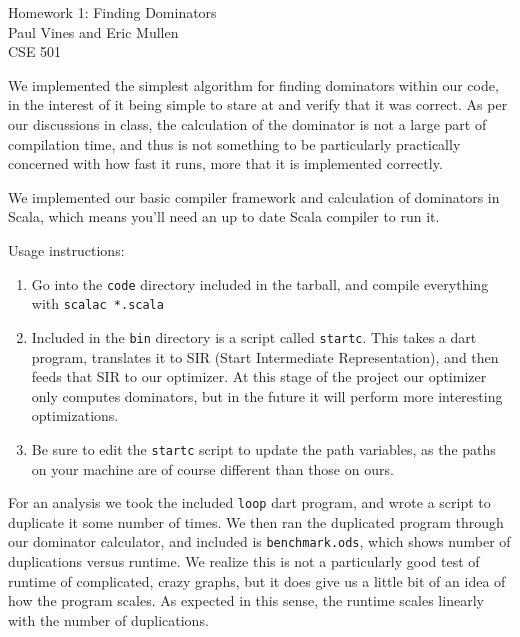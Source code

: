 \documentclass[12pt,letterpaper]{article}
\begin{document}
\begin{flushright}
Homework 1: Finding Dominators\\
Paul Vines and Eric Mullen\\
CSE 501\\
\end{flushright}

We implemented the simplest algorithm for finding dominators within
our code, in the interest of it being simple to stare at and verify
that it was correct. As per our discussions in class, the calculation
of the dominator is not a large part of compilation time, and thus is
not something to be particularly practically concerned with how fast
it runs, more that it is implemented correctly.

We implemented our basic compiler framework and calculation of
dominators in Scala, which means you'll need an up to date Scala
compiler to run it.

Usage instructions:
\begin{enumerate}
  \item Go into the \texttt{code} directory included in the tarball,
    and compile everything with \texttt{scalac *.scala}
  \item Included in the \texttt{bin} directory is a script called
    \texttt{startc}. This takes a dart program, translates it to SIR
    (Start Intermediate Representation), and then feeds that SIR to
    our optimizer. At this stage of the project our optimizer only
    computes dominators, but in the future it will perform more
    interesting optimizations.
  \item Be sure to edit the \texttt{startc} script to update the path
    variables, as the paths on your machine are of course different
    than those on ours.
\end{enumerate}

For an analysis we took the included \texttt{loop} dart program, and
wrote a script to duplicate it some number of times. We then ran the
duplicated program through our dominator calculator, and included is
\texttt{benchmark.ods}, which shows number of duplications versus
runtime. We realize this is not a particularly good test of runtime of
complicated, crazy graphs, but it does give us a little bit of an idea
of how the program scales. As expected in this sense, the runtime
scales linearly with the number of duplications.
\end{document}
